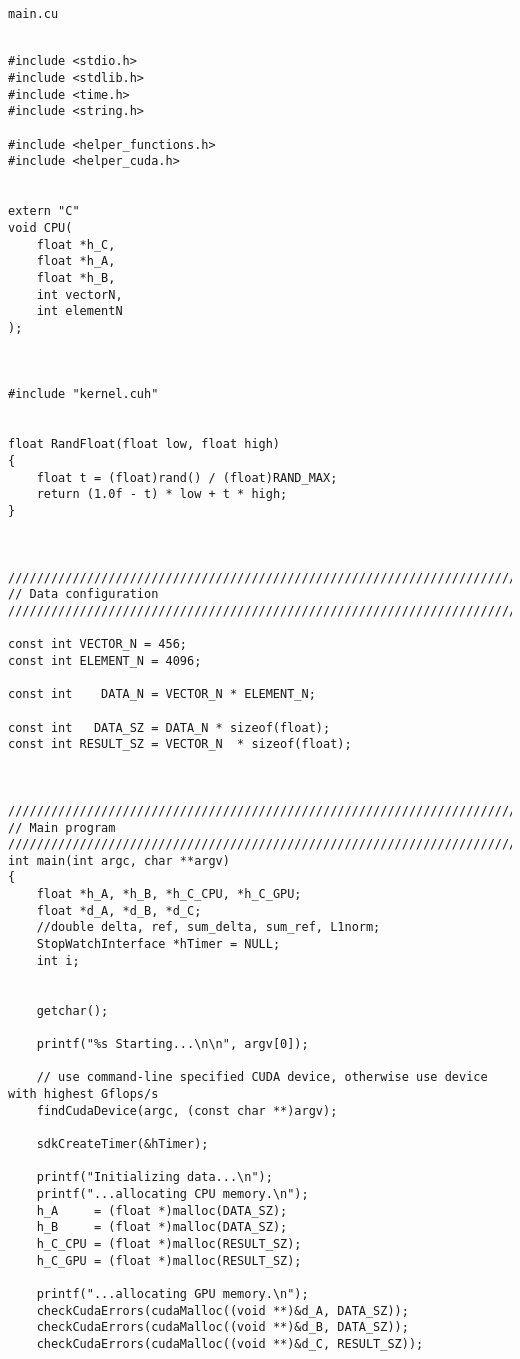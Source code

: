 \texttt{main.cu}
\begin{lstlisting}[frame=single]  % Start your code-block

#include <stdio.h>
#include <stdlib.h>
#include <time.h>
#include <string.h>

#include <helper_functions.h>
#include <helper_cuda.h>


extern "C"
void CPU(
    float *h_C,
    float *h_A,
    float *h_B,
    int vectorN,
    int elementN
);



#include "kernel.cuh"


float RandFloat(float low, float high)
{
    float t = (float)rand() / (float)RAND_MAX;
    return (1.0f - t) * low + t * high;
}



///////////////////////////////////////////////////////////////////////////////
// Data configuration
///////////////////////////////////////////////////////////////////////////////

const int VECTOR_N = 456;
const int ELEMENT_N = 4096;

const int    DATA_N = VECTOR_N * ELEMENT_N;

const int   DATA_SZ = DATA_N * sizeof(float);
const int RESULT_SZ = VECTOR_N  * sizeof(float);



///////////////////////////////////////////////////////////////////////////////
// Main program
///////////////////////////////////////////////////////////////////////////////
int main(int argc, char **argv)
{
    float *h_A, *h_B, *h_C_CPU, *h_C_GPU;
    float *d_A, *d_B, *d_C;
    //double delta, ref, sum_delta, sum_ref, L1norm;
    StopWatchInterface *hTimer = NULL;
    int i;


	getchar();

    printf("%s Starting...\n\n", argv[0]);

    // use command-line specified CUDA device, otherwise use device with highest Gflops/s
    findCudaDevice(argc, (const char **)argv);

    sdkCreateTimer(&hTimer);

    printf("Initializing data...\n");
    printf("...allocating CPU memory.\n");
    h_A     = (float *)malloc(DATA_SZ);
    h_B     = (float *)malloc(DATA_SZ);
    h_C_CPU = (float *)malloc(RESULT_SZ);
    h_C_GPU = (float *)malloc(RESULT_SZ);

    printf("...allocating GPU memory.\n");
    checkCudaErrors(cudaMalloc((void **)&d_A, DATA_SZ));
    checkCudaErrors(cudaMalloc((void **)&d_B, DATA_SZ));
    checkCudaErrors(cudaMalloc((void **)&d_C, RESULT_SZ));


\end{lstlisting}
